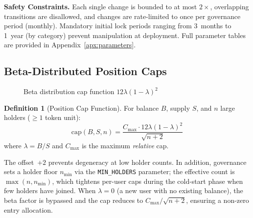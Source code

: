 \documentclass[10pt,a4paper,twocolumn]{article}
\theoremstyle{definition}
\newtheorem{definition}{Definition}[section]
\theoremstyle{plain}
\theoremstyle{remark}
\begin{document}
\textbf{Safety Constraints.} Each single change is bounded to at most $2\times$, overlapping transitions are disallowed, and changes are rate-limited to once per governance period (monthly). Mandatory initial lock periods ranging from 3~months to 1~year (by category) prevent manipulation at deployment. Full parameter tables are provided in Appendix~\ref{apx:parameters}.

\subsection{Beta-Distributed Position Caps}
\label{subsec:beta-caps}

\begin{figure}[htbp]
\centering
{}
\caption{Beta distribution cap function \mbox{$12\lambda(1{-}\lambda)^2$}}
\label{fig:beta-distribution}
\end{figure}

\begin{definition}[Position Cap Function]
\label{def:cap}
For balance $B$, supply $S$, and $n$ large holders ($\geq 1$ token unit):
\begin{equation}
\label{eq:beta-cap}
\text{cap}(B, S, n) = \frac{C_{\max} \cdot 12\lambda(1{-}\lambda)^2}{\sqrt{n + 2}}
\end{equation}
where $\lambda = B/S$ and $C_{\max}$ is the maximum \emph{relative} cap.
\end{definition}

The offset~$+2$ prevents degeneracy at low holder counts. In addition, governance sets a holder floor $n_{\min}$ via the \texttt{MIN\_HOLDERS} parameter; the effective count is $\max(n, n_{\min})$, which tightens per-user caps during the cold-start phase when few holders have joined. When $\lambda = 0$ (a new user with no existing balance), the beta factor is bypassed and the cap reduces to $C_{\max}/\sqrt{n{+}2}$, ensuring a non-zero entry allocation.
\end{document}
